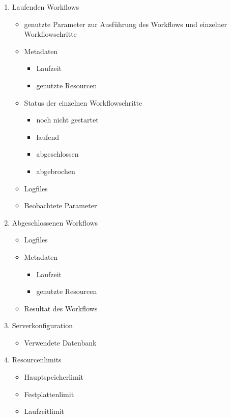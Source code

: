\begin{enumerate}
    \item Laufenden Workflows
    \begin{itemize}
        \setlength\itemsep{-1em}
        \item genutzte Parameter zur Ausführung des Workflows und einzelner Workflowschritte
        \item Metadaten
        \begin{itemize}
            \setlength\itemsep{-1em}
            \item Laufzeit
            \item genutzte Resourcen
        \end{itemize}
        \item Status der einzelnen Workflowschritte
        \begin{itemize}
            \setlength\itemsep{-1em}
            \item noch nicht gestartet
            \item laufend
            \item abgeschlossen
            \item abgebrochen
        \end{itemize}
        \item Logfiles
        \item Beobachtete Parameter
    \end{itemize}
    
    \item Abgeschlossenen Workflows
    \begin{itemize}
        \setlength\itemsep{-1em}
        \item Logfiles
        \item Metadaten
        \begin{itemize}
            \setlength\itemsep{-1em}
            \item Laufzeit
            \item genutzte Resourcen
        \end{itemize}
        \item Resultat des Workflows
    \end{itemize}
    
    \item Serverkonfiguration
    \begin{itemize}
        \setlength\itemsep{-1em}
        \item Verwendete Datenbank
    \end{itemize}
    
    \item Resourcenlimits
    \begin{itemize}
        \setlength\itemsep{-1em}
        \item Hauptspeicherlimit
        \item Festplattenlimit
        \item Laufzeitlimit
    \end{itemize}
 \end{enumerate}